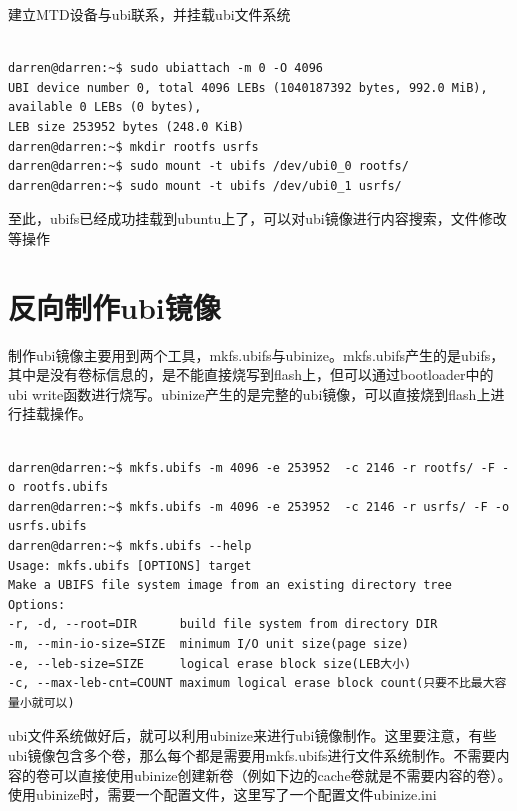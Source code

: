 \noindent 建立MTD设备与ubi联系，并挂载ubi文件系统
\begin{mdframed}[backgroundcolor=lightgray,hidealllines=true]
\begin{verbatim}

darren@darren:~$ sudo ubiattach -m 0 -O 4096
UBI device number 0, total 4096 LEBs (1040187392 bytes, 992.0 MiB), available 0 LEBs (0 bytes), 
LEB size 253952 bytes (248.0 KiB)
darren@darren:~$ mkdir rootfs usrfs
darren@darren:~$ sudo mount -t ubifs /dev/ubi0_0 rootfs/
darren@darren:~$ sudo mount -t ubifs /dev/ubi0_1 usrfs/

\end{verbatim}
\end{mdframed}
至此，ubifs已经成功挂载到ubuntu上了，可以对ubi镜像进行内容搜索，文件修改等操作

\section{反向制作ubi镜像}
制作ubi镜像主要用到两个工具，mkfs.ubifs与ubinize。mkfs.ubifs产生的是ubifs，其中是没有卷标信息的，是不能直接烧写到flash上，但可以通过bootloader中的ubi write函数进行烧写。ubinize产生的是完整的ubi镜像，可以直接烧到flash上进行挂载操作。
\begin{mdframed}[backgroundcolor=lightgray,hidealllines=true]
\begin{verbatim}

darren@darren:~$ mkfs.ubifs -m 4096 -e 253952  -c 2146 -r rootfs/ -F -o rootfs.ubifs
darren@darren:~$ mkfs.ubifs -m 4096 -e 253952  -c 2146 -r usrfs/ -F -o usrfs.ubifs
darren@darren:~$ mkfs.ubifs --help
Usage: mkfs.ubifs [OPTIONS] target
Make a UBIFS file system image from an existing directory tree
Options:
-r, -d, --root=DIR      build file system from directory DIR
-m, --min-io-size=SIZE  minimum I/O unit size(page size)
-e, --leb-size=SIZE     logical erase block size(LEB大小)
-c, --max-leb-cnt=COUNT maximum logical erase block count(只要不比最大容量小就可以)

\end{verbatim}
\end{mdframed}
ubi文件系统做好后，就可以利用ubinize来进行ubi镜像制作。这里要注意，有些ubi镜像包含多个卷，那么每个都是需要用mkfs.ubifs进行文件系统制作。不需要内容的卷可以直接使用ubinize创建新卷（例如下边的cache卷就是不需要内容的卷）。使用ubinize时，需要一个配置文件，这里写了一个配置文件ubinize.ini
